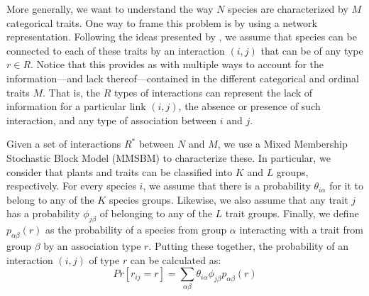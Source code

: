 \documentclass[11pt, a4paper]{article}
\begin{document}
More generally, we want to understand the way $N$ species are characterized by $M$ categorical traits. One way to frame this problem is by using a network representation. Following the ideas presented by \citet{godoy-loriteAccurateScalableSocial2016}, we assume that species can be connected to each of these traits by an interaction $\left(i, j\right)$ that can be of any type $r\in R$. Notice that this provides as with multiple ways to account for the information---and lack thereof---contained in the different categorical and ordinal traits $M$. That is, the $R$ types of interactions can represent the lack of information for a particular link $\left(i, j\right)$, the absence or presence of such interaction, and any type of association between $i$ and $j$. 

Given a set of interactions $R^{*}$ between $N$ and $M$, we use a Mixed Membership Stochastic Block Model (MMSBM) to characterize these. In particular, we consider that plants and traits can be classified into $K$ and $L$ groups, respectively. For every species $i$, we assume that there is a probability $\theta_{i\alpha}$ for it to belong to any of the $K$ species groups. Likewise, we also assume that any trait $j$ has a probability $\phi_{j\beta}$ of belonging to any of the $L$ trait groups. Finally, we define $p_{\alpha\beta}\left(r\right)$ as the probability of a species from group $\alpha$ interacting with a trait from group $\beta$ by an association type $r$. Putting these together, the probability of an interaction $\left(i, j\right)$ of type $r$ can be calculated as:
\begin{equation}
Pr[r_{ij}=r] = \sum_{\alpha \beta} \theta_{i\alpha} \phi_{j\beta} p_{\alpha\beta}\left(r\right)
\end{equation}
\end{document}
